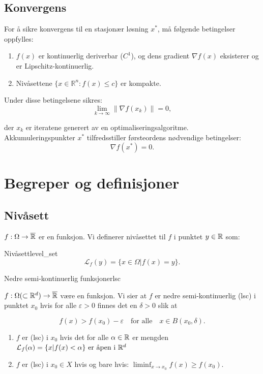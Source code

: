 \documentclass[11pt, a4paper]{article}
\begin{document}
\subsection*{Konvergens}
For å sikre konvergens til en stasjonær løsning \( x^* \), må følgende betingelser oppfylles:
\begin{enumerate}
    \item \( f(x) \) er kontinuerlig deriverbar (\( C^1 \)), og dens gradient \( \nabla f(x) \) eksisterer og er Lipschitz-kontinuerlig.
    \item Nivåsettene \( \{x \in \mathbb{R}^n : f(x) \leq c\} \) er kompakte.
\end{enumerate}

Under disse betingelsene sikres:
\[
    \lim_{k \to \infty} \|\nabla f(x_k)\| = 0,
\]

der \( x_k \) er iteratene generert av en optimaliseringsalgoritme. Akkumuleringspunkter \( x^* \) tilfredsstiller førsteordens nødvendige betingelser:
\[
    \nabla f(x^*) = 0.
\]

\section{Begreper og definisjoner}

\subsection{Nivåsett}

$f: \Omega \to \overline{\mathbb{R}}$ er en funksjon. Vi definerer nivåsettet til $f$ i punktet $y \in \mathbb{R}$ som:

\begin{definition}{Nivåsett}{level_set}
    \[
        \mathcal{L}_f(y) = \{x \in \Omega | f(x) = y\}.
    \]
\end{definition}

\begin{definition}{Nedre semi-kontinuerlig funksjoner}{lsc}

    $f: \Omega (\subset \mathbb{R}^d) \to \overline{\mathbb{R}}$ være en funksjon. Vi sier at $f$ er nedre semi-kontinuerlig (lsc) i punktet $x_0$ hvis for alle $\varepsilon > 0$ finnes det en $\delta > 0$ slik at

    \[
        f(x) > f(x_0) - \varepsilon \quad \text{for alle} \quad x \in B(x_0, \delta).
    \]

    \begin{enumerate}
        \item $f$ er (lsc) i $x_0$ hvis det for alle $\alpha \in \mathbb{R}$ er mengden $\mathcal{L}_f(\alpha) = \{x | f(x) < \alpha \} \text{ er åpen i } \mathbb{R}^d$
        \item $f$ er (lsc) i $x_0 \in X$ hvis og bare hvis: $\liminf_{x \to x_0} f(x) \geq f(x_0)$.
    \end{enumerate}

\end{definition}
\end{document}
